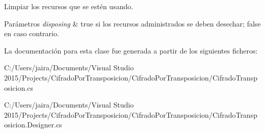 Limpiar los recursos que se estén usando. 


\begin{DoxyParams}{Parámetros}
{\em disposing} & true si los recursos administrados se deben desechar; false en caso contrario.\\
\hline
\end{DoxyParams}


La documentación para esta clase fue generada a partir de los siguientes ficheros\+:\begin{DoxyCompactItemize}
\item 
C\+:/\+Users/jaira/\+Documents/\+Visual Studio 2015/\+Projects/\+Cifrado\+Por\+Transposicion/\+Cifrado\+Por\+Transposicion/Cifrado\+Transposicion.\+cs\item 
C\+:/\+Users/jaira/\+Documents/\+Visual Studio 2015/\+Projects/\+Cifrado\+Por\+Transposicion/\+Cifrado\+Por\+Transposicion/Cifrado\+Transposicion.\+Designer.\+cs\end{DoxyCompactItemize}
